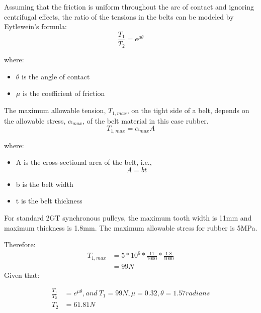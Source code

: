 Assuming that the friction is uniform throughout the arc of contact and ignoring centrifugal effects, the ratio of the tensions in the belts can be modeled by Eytlewein’s formula:
\begin{equation}
    \frac{T_1}{T_2} = e^{\mu \theta}
\end{equation}

where:
\begin{itemize}
    \item \(\theta\) is the angle of contact
    \item \(\mu\) is the coefficient of friction
\end{itemize}

The maximum allowable tension, \(T_{1,max}\), on the tight side of a belt, depends on the allowable stress, \(\alpha_{max}\), of the belt material in this case rubber. 
\begin{equation}
    T_{1, max} = \alpha_{max}A
\end{equation}

where:
\begin{itemize}
    \item A is the cross-sectional area of the belt, i.e., \begin{equation}
        A = bt
    \end{equation}
    \item b is the belt width
    \item t is the belt thickness
\end{itemize}

For standard 2GT synchronous pulleys, the maximum tooth width is 11mm and maximum thickness is 1.8mm.
The maximum allowable stress for rubber is 5MPa.
\par
Therefore:
\begin{equation}
    \begin{aligned}
         T_{1,max}& =5*10^6*\frac{11}{1000}*\frac{1.8}{1000}\\
         & = 99N
    \end{aligned}
\end{equation}
Given that:

\begin{equation}
    \begin{aligned}
       \frac{T_1}{T_2}&= e^{\mu\theta},
        and\  
        T_1 = 99N,   \mu =0.32,  \theta= 1.57 radians\\
        T_2 &= 61.81N
    \end{aligned}
\end{equation}

